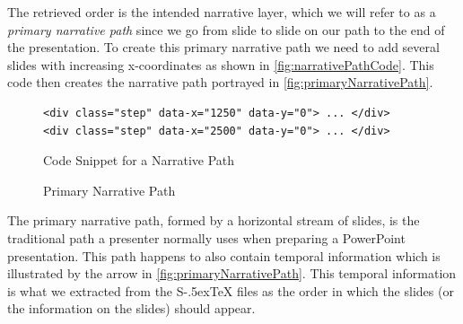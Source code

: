 \documentclass[twoside, 12pt]{article}
\def\stex{\texorpdfstring{\raisebox{-.5ex}S\kern-.5ex\TeX}{sTeX}\xspace}
\begin{document}
The retrieved order is the intended narrative layer, which we will refer to as a \textit{primary narrative path} since we go from slide to slide on our path to the end of the presentation. To create this primary narrative path we need to add several slides with increasing x-coordinates as shown in \autoref{fig:narrativePathCode}. This code then creates the narrative path portrayed in \autoref{fig:primaryNarrativePath}.\\

\begin{figure}
\vspace{-20pt}
\begin{verbatim}
<div class="step" data-x="1250" data-y="0"> ... </div>
<div class="step" data-x="2500" data-y="0"> ... </div>
\end{verbatim}
\vspace{-8pt}
  \caption{Code Snippet for a Narrative Path}
  \label{fig:narrativePathCode}
  \vspace{12pt}
\end{figure}

\begin{figure}
\vspace{-30pt}
  \begin{center}
  \end{center}
\vspace{-20pt}
  \caption{Primary Narrative Path}
  \label{fig:primaryNarrativePath}
\vspace{12pt}
\end{figure}

\begin{figure}
\vspace{-50pt}
\end{figure}

The primary narrative path, formed by a horizontal stream of slides, is the traditional path a presenter normally uses when preparing a PowerPoint presentation. This path happens to also contain temporal information which is illustrated by the arrow in \autoref{fig:primaryNarrativePath}. This temporal information is what we extracted from the \stex files as the order in which the slides (or the information on the slides) should appear.\\
\end{document}
